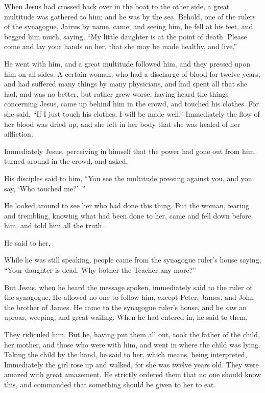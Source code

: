 {\par }{\PP {}When Jesus had crossed back over in the boat to the other side, a great multitude was gathered to him; and he was by the sea.
Behold, one of the rulers of the synagogue, Jairus by name, came; and seeing him, he fell at his feet,
and begged him much, saying, “My little daughter is at the point of death. Please come and lay your hands on her, that she may be made healthy, and live.”
\par }{\PP {}He went with him, and a great multitude followed him, and they pressed upon him on all sides.
A certain woman, who had a discharge of blood for twelve years,
and had suffered many things by many physicians, and had spent all that she had, and was no better, but rather grew worse,
having heard the things concerning Jesus, came up behind him in the crowd, and touched his clothes.
For she said, “If I just touch his clothes, I will be made well.”
Immediately the flow of her blood was dried up, and she felt in her body that she was healed of her affliction.
\par }{\PP {}Immediately Jesus, perceiving in himself that the power had gone out from him, turned around in the crowd, and asked,
{}
\par }{\PP {}His disciples said to him, “You see the multitude pressing against you, and you say, ‘Who touched me?’ ”
\par }{\PP {}He looked around to see her who had done this thing.
But the woman, fearing and trembling, knowing what had been done to her, came and fell down before him, and told him all the truth.
\par }{\PP {}He said to her,
{}
\par }{\PP {}While he was still speaking, people came from the synagogue ruler’s house saying, “Your daughter is dead. Why bother the Teacher any more?”
\par }{\PP {}But Jesus, when he heard the message spoken, immediately said to the ruler of the synagogue,
{}
He allowed no one to follow him, except Peter, James, and John the brother of James.
He came to the synagogue ruler’s house, and he saw an uproar, weeping, and great wailing.
When he had entered in, he said to them,
{}
\par }{\PP {}They ridiculed him. But he, having put them all out, took the father of the child, her mother, and those who were with him, and went in where the child was lying.
Taking the child by the hand, he said to her,
{} which means, being interpreted,
{}
Immediately the girl rose up and walked, for she was twelve years old. They were amazed with great amazement.
He strictly ordered them that no one should know this, and commanded that something should be given to her to eat.

}
